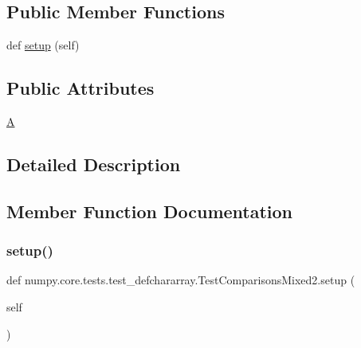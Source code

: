 \subsection*{Public Member Functions}
\begin{DoxyCompactItemize}
\item 
def \hyperlink{classnumpy_1_1core_1_1tests_1_1test__defchararray_1_1TestComparisonsMixed2_a351faea03d84d694e5364c616778a7ad}{setup} (self)
\end{DoxyCompactItemize}
\subsection*{Public Attributes}
\begin{DoxyCompactItemize}
\item 
\hyperlink{classnumpy_1_1core_1_1tests_1_1test__defchararray_1_1TestComparisonsMixed2_a132f545e38ff04cfb0ff47236b0e2abf}{A}
\end{DoxyCompactItemize}


\subsection{Detailed Description}
 

\subsection{Member Function Documentation}
\mbox{\label{classnumpy_1_1core_1_1tests_1_1test__defchararray_1_1TestComparisonsMixed2_a351faea03d84d694e5364c616778a7ad}} 
\subsubsection{\texorpdfstring{setup()}{setup()}}
{\footnotesize\ttfamily def numpy.\+core.\+tests.\+test\+\_\+defchararray.\+Test\+Comparisons\+Mixed2.\+setup (\begin{DoxyParamCaption}\item[{}]{self }\end{DoxyParamCaption})}



